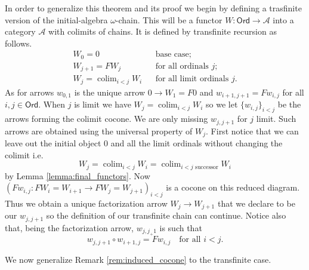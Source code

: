 \documentclass[letterpaper, 11pt, oneside]{memoir}
\theoremstyle{myteo}
\numberwithin{equation}{section}
\DeclareMathOperator*\colim{colim}
\newcommand{\Ord}{\textsf{Ord}}
\newcommand{\A}{\mathscr{A}}
\begin{document}
In order to generalize this theorem and its proof we begin by defining a trasfinite version of the initial-algebra \(\omega\)-chain.
This will be a functor \(W : \Ord \to \A\) into a category \(\A\) with colimits of chains.
It is defined by transfinite recursion as follows.
\begin{align*}
  W_0 = 0 && \text{base case};\\
  W_{j+1} = FW_j && \text{for all ordinals \(j\)};\\
  W_j = \colim_{i < j}W_i && \text{for all limit ordinals \(j\)}.
\end{align*}
As for arrows \(w_{0,1}\) is the unique arrow \(0 \to W_1 = F0\) and \(w_{i + 1, j+1} = Fw_{i,j}\) for all \(i, j \in \Ord\).
When \(j\) is limit we have \(W_j = \colim_{i < j}W_i\) so we let \(\{w_{i,j}\}_{i < j}\) be the arrows forming the colimit cocone.
We are only missing \(w_{j, j+1}\) for \(j\) limit.
Such arrows are obtained using the universal property of \(W_j\).
First notice that we can leave out the initial object \(0\) and all the limit ordinals without changing the colimit i.e.
\begin{equation*}
  W_j = \colim_{i < j}W_i = \colim_{\text{\(i < j\) successor}}W_i
\end{equation*}
by Lemma \ref{lemma:final_functors}.
Now \((Fw_{i,j} : FW_i = W_{i+1} \to FW_{j} = W_{j+1})_{i < j}\) is a cocone on this reduced diagram.
Thus we obtain a unique factorization arrow \(W_j \to W_{j+1}\) that we declare to be our \(w_{j, j+1}\) so the definition of our transfinite chain can continue.
Notice also that, being the factorization arrow, \(w_{j, j_+1}\) is such that
\begin{equation}
  \label{eq:omega-to-omega-plus-one}
  w_{j, j+1} \circ w_{i+1, j} = Fw_{i, j} \quad \text{for all \(i < j\)}.
\end{equation}

We now generalize Remark \ref{rem:induced_cocone} to the transfinite case.
\end{document}
